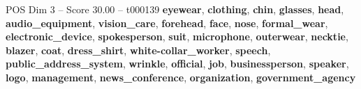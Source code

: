 \begin{textsample}{POS Dim 3 – Score 30.00 – t000139}  \label{ex:f3_pos_038}
\textbf{eyewear}, \textbf{clothing}, \textbf{chin}, \textbf{glasses}, \textbf{head}, \textbf{audio\_equipment}, \textbf{vision\_care}, \textbf{forehead}, \textbf{face}, \textbf{nose}, \textbf{formal\_wear}, \textbf{electronic\_device}, \textbf{spokesperson}, \textbf{suit}, \textbf{microphone}, \textbf{outerwear}, \textbf{necktie}, \textbf{blazer}, \textbf{coat}, \textbf{dress\_shirt}, \textbf{white-collar\_worker}, \textbf{speech}, \textbf{public\_address\_system}, \textbf{wrinkle}, \textbf{official}, \textbf{job}, \textbf{businessperson}, \textbf{speaker}, \textbf{logo}, \textbf{management}, \textbf{news\_conference}, \textbf{organization}, \textbf{government\_agency}

\end{textsample}
